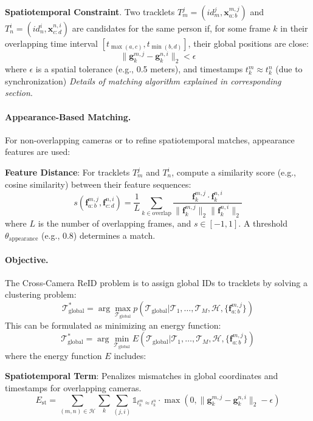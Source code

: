 \documentclass[12pt, a4paper]{article}
\begin{document}
\textbf{Spatiotemporal Constraint}. Two tracklets $T_m^j = (id_m^j, \mathbf{x}_{a:b}^{m,j})$ and $T_n^i = (id_n^i, \mathbf{x}_{c:d}^{n,i})$ are candidates for the same person if, for some frame $k$ in their overlapping time interval $[t_{\max(a,c)}, t_{\min(b,d)}]$, their global positions are close:
  \[
  \| \mathbf{g}_k^{m,j} - \mathbf{g}_k^{n,i} \|_2 < \epsilon
  \]
  where $\epsilon$ is a spatial tolerance (e.g., 0.5 meters), and timestamps $t_k^m \approx t_k^n$ (due to synchronization) \textit{Details of matching algorithm explained in corresponding section}.

\paragraph{Appearance-Based Matching.}
For non-overlapping cameras or to refine spatiotemporal matches, appearance features are used:

\textbf{Feature Distance}: For tracklets $T_m^j$ and $T_n^i$, compute a similarity score (e.g., cosine similarity) between their feature sequences:
  \[
  s(\mathbf{f}_{a:b}^{m,j}, \mathbf{f}_{c:d}^{n,i}) = \frac{1}{L} \sum_{k \in \text{overlap}} \frac{\mathbf{f}_k^{m,j} \cdot \mathbf{f}_k^{n,i}}{\|\mathbf{f}_k^{m,j}\|_2 \|\mathbf{f}_k^{n,i}\|_2}
  \]
  where $L$ is the number of overlapping frames, and $s \in [-1, 1]$. A threshold $\theta_{\text{appearance}}$ (e.g., 0.8) determines a match.


\paragraph{Objective.}
The Cross-Camera ReID problem is to assign global IDs to tracklets by solving a clustering problem: 
\[
\mathcal{T}_{\text{global}}^* = \arg\max_{\mathcal{T}_{\text{global}}} p(\mathcal{T}_{\text{global}} | \mathcal{T}_1, \ldots, \mathcal{T}_M, \mathcal{H}, \{\mathbf{f}_{a:b}^{m,j}\})
\]
This can be formulated as minimizing an energy function:
\[
\mathcal{T}_{\text{global}}^* = \arg\min_{\mathcal{T}_{\text{global}}} E(\mathcal{T}_{\text{global}} | \mathcal{T}_1, \ldots, \mathcal{T}_M, \mathcal{H}, \{\mathbf{f}_{a:b}^{m,j}\})
\]
where the energy function $E$ includes:

\textbf{Spatiotemporal Term}: Penalizes mismatches in global coordinates and timestamps for overlapping cameras.
  \[
  E_{\text{st}} = \sum_{(m,n) \in \mathcal{H}} \sum_{k} \sum_{(j,i)} \mathbb{1}_{t_k^m \approx t_k^n} \cdot \max(0, \| \mathbf{g}_k^{m,j} - \mathbf{g}_k^{n,i} \|_2 - \epsilon)
  \]
  
\end{document}
